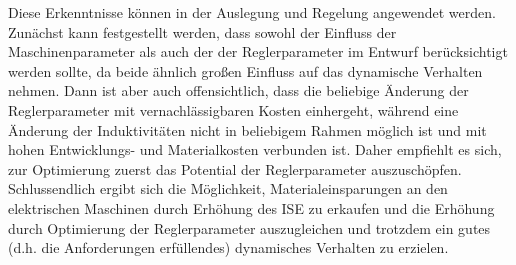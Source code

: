 Diese Erkenntnisse können in der Auslegung und Regelung angewendet werden. Zunächst kann festgestellt werden, dass sowohl der Einfluss der Maschinenparameter als auch der der Reglerparameter im Entwurf berücksichtigt werden sollte, da beide ähnlich großen Einfluss auf das dynamische Verhalten nehmen. Dann ist aber auch offensichtlich, dass die beliebige Änderung der Reglerparameter mit vernachlässigbaren Kosten einhergeht, während eine Änderung der Induktivitäten nicht in beliebigem Rahmen möglich ist und mit hohen Entwicklungs- und Materialkosten verbunden ist. Daher empfiehlt es sich, zur Optimierung zuerst das Potential der Reglerparameter auszuschöpfen. Schlussendlich ergibt sich die Möglichkeit, Materialeinsparungen an den elektrischen Maschinen durch Erhöhung des ISE zu erkaufen und die Erhöhung durch Optimierung der Reglerparameter auszugleichen und trotzdem ein gutes (d.h. die Anforderungen erfüllendes) dynamisches Verhalten zu erzielen.


